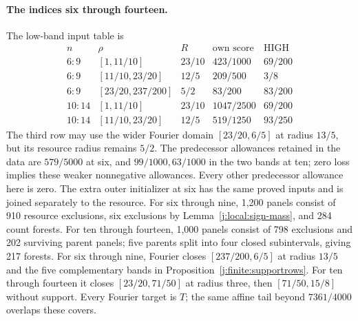 \paragraph{The indices six through fourteen.}
The low-band input table is
\[
\begin{array}{c|c|c|c|c}
n&\rho&R&\text{own score}&\text{HIGH}\\\hline
6\!:\!9&[1,11/10]&23/10&423/1000&69/200\\
6\!:\!9&[11/10,23/20]&12/5&209/500&3/8\\
6\!:\!9&[23/20,237/200]&5/2&83/200&83/200\\
10\!:\!14&[1,11/10]&23/10&1047/2500&69/200\\
10\!:\!14&[11/10,23/20]&12/5&519/1250&93/250
\end{array}
\]
The third row may use the wider Fourier domain
$[23/20,6/5]$ at radius $13/5$, but its resource radius remains $5/2$.
The predecessor allowances retained in the data are $579/5000$ at six,
and $99/1000,63/1000$ in the two bands at ten; zero loss implies
these weaker nonnegative allowances. Every other predecessor allowance
here is zero. The extra outer initializer at six has the same proved
inputs and is joined separately to the resource.
For six through nine, 1,200 panels consist of 910 resource exclusions,
six exclusions by Lemma~\ref{j:local:sign-mass}, and 284 count forests.
For ten through fourteen, 1,000 panels consist of 798 exclusions and
202 surviving parent panels; five parents split into four closed
subintervals, giving 217 forests.
For six through nine, Fourier closes $[237/200,6/5]$ at radius $13/5$
and the five complementary bands in Proposition~\ref{j:finite:supportrows}.
For ten through fourteen it closes $[23/20,71/50]$ at radius three,
then $[71/50,15/8]$ without support. Every Fourier target is $T$;
the same affine tail beyond $7361/4000$ overlaps these covers.

